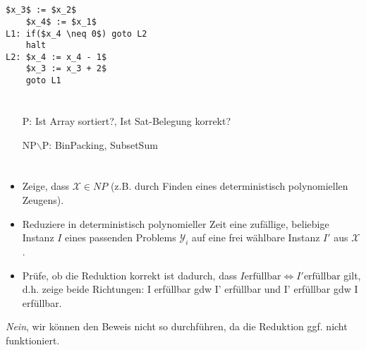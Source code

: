 \documentclass{article}
\begin{document}
\section{}%
\begin{lstlisting}[mathescape]
    $x_3$ := $x_2$
    $x_4$ := $x_1$
L1: if($x_4 \neq 0$) goto L2
    halt
L2: $x_4 := x_4 - 1$
    $x_3 := x_3 + 2$
    goto L1
\end{lstlisting}

\section{}%
\begin{center}
\end{center}
\begin{enumerate}
	\item[P:] Ist Array sortiert?, Ist Sat-Belegung korrekt?
  \item[NP$\backslash$P:] BinPacking, SubsetSum
\end{enumerate}

\section{}%
\begin{itemize}
	\item Zeige, dass $\mathcal{X}\in NP$ (z.B. durch Finden eines deterministisch polynomiellen Zeugens).
  \item Reduziere in deterministisch polynomieller Zeit eine zufällige, beliebige Instanz $I$ eines passenden Problems $\mathcal{Y}_i$ auf eine frei wählbare Instanz $I'$ aus $\mathcal{X}$.
  \item Prüfe, ob die Reduktion korrekt ist dadurch, dass $I \text{erfüllbar} \Leftrightarrow I' \text{erfüllbar}$ gilt, d.h. zeige beide Richtungen: I erfüllbar gdw I' erfüllbar und I' erfüllbar gdw I erfüllbar.
\end{itemize}
\emph{Nein}, wir können den Beweis nicht so durchführen, da die Reduktion ggf. nicht funktioniert.
\end{document}

